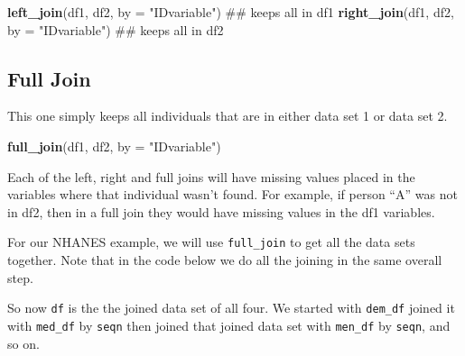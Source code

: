 \documentclass[]{tufte-book}
\newenvironment{Shaded}{}{}
\newcommand{\KeywordTok}[1]{\textcolor[rgb]{0.00,0.44,0.13}{\textbf{#1}}}
\newcommand{\DataTypeTok}[1]{\textcolor[rgb]{0.56,0.13,0.00}{#1}}
\newcommand{\StringTok}[1]{\textcolor[rgb]{0.25,0.44,0.63}{#1}}
\newcommand{\OperatorTok}[1]{\textcolor[rgb]{0.40,0.40,0.40}{#1}}
\newcommand{\NormalTok}[1]{#1}
\theoremstyle{definition}
\theoremstyle{definition}
\theoremstyle{remark}
\begin{document}
\begin{Shaded}
\begin{Highlighting}[]
\KeywordTok{left_join}\NormalTok{(df1, df2, }\DataTypeTok{by =} \StringTok{"IDvariable"}\NormalTok{)  ## keeps all in df1}
\KeywordTok{right_join}\NormalTok{(df1, df2, }\DataTypeTok{by =} \StringTok{"IDvariable"}\NormalTok{)  ## keeps all in df2}
\end{Highlighting}
\end{Shaded}

\subsection*{Full Join}\label{full-join}

This one simply keeps all individuals that are in either data set 1 or
data set 2.

\begin{Shaded}
\begin{Highlighting}[]
\KeywordTok{full_join}\NormalTok{(df1, df2, }\DataTypeTok{by =} \StringTok{"IDvariable"}\NormalTok{)}
\end{Highlighting}
\end{Shaded}

Each of the left, right and full joins will have missing values placed
in the variables where that individual wasn't found. For example, if
person ``A'' was not in df2, then in a full join they would have missing
values in the df1 variables.

For our NHANES example, we will use \texttt{full\_join} to get all the
data sets together. Note that in the code below we do all the joining in
the same overall step.

\begin{Shaded}
\end{Shaded}

So now \texttt{df} is the the joined data set of all four. We started
with \texttt{dem\_df} joined it with \texttt{med\_df} by \texttt{seqn}
then joined that joined data set with \texttt{men\_df} by \texttt{seqn},
and so on.
\end{document}
